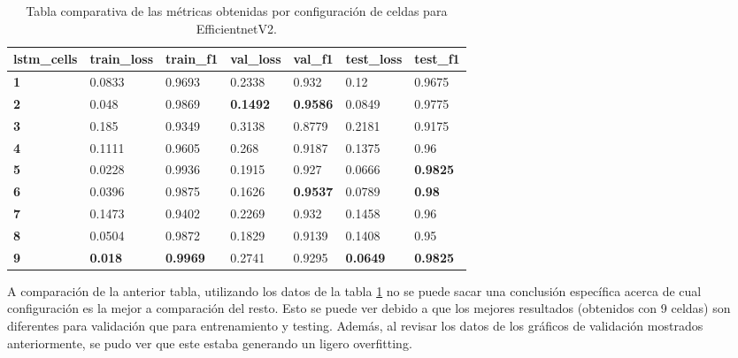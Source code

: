 \begin{table}[h!]
\centering
\begin{tabular}{|l|l|l|l|l|l|l|}
\hline
\textbf{lstm\_cells} & \textbf{train\_loss} & \textbf{train\_f1} & \textbf{val\_loss} & \textbf{val\_f1} & \textbf{test\_loss} & \textbf{test\_f1} \\ \hline
\textbf{1}  & 0.0833               & 0.9693             & 0.2338             & 0.932            & 0.12                & 0.9675            \\ \hline
\textbf{2}  & 0.048                & 0.9869             & \textbf{0.1492}    & \textbf{0.9586}  & 0.0849              & 0.9775            \\ \hline
\textbf{3}  & 0.185                & 0.9349             & 0.3138             & 0.8779           & 0.2181              & 0.9175            \\ \hline
\textbf{4}  & 0.1111               & 0.9605             & 0.268              & 0.9187           & 0.1375              & 0.96              \\ \hline
\textbf{5}  & 0.0228               & 0.9936             & 0.1915             & 0.927            & 0.0666              & \textbf{0.9825}   \\ \hline
\textbf{6}  & 0.0396               & 0.9875             & 0.1626             & \textbf{0.9537}  & 0.0789              & \textbf{0.98}     \\ \hline
\textbf{7}  & 0.1473               & 0.9402             & 0.2269             & 0.932            & 0.1458              & 0.96              \\ \hline
\textbf{8}  & 0.0504               & 0.9872             & 0.1829             & 0.9139           & 0.1408              & 0.95              \\ \hline
\textbf{9}  & \textbf{0.018}       & \textbf{0.9969}    & 0.2741             & 0.9295           & \textbf{0.0649}     & \textbf{0.9825}   \\ \hline
\end{tabular}
\caption{ Tabla comparativa de las métricas obtenidas por configuración de celdas para EfficientnetV2.}
\label{table:efficientnetV2Metrics}
\end{table}

A comparación de la anterior tabla, utilizando los datos de la tabla 
\ref{table:efficientnetV2Metrics} no se puede sacar una conclusión 
específica acerca de cual configuración es la mejor a comparación del resto. 
Esto se puede ver debido a que los mejores resultados (obtenidos con 9 celdas) 
son diferentes para validación que para entrenamiento y testing. Además, 
al revisar los datos de los gráficos de validación mostrados anteriormente, se 
pudo ver que este estaba generando un ligero overfitting. 


